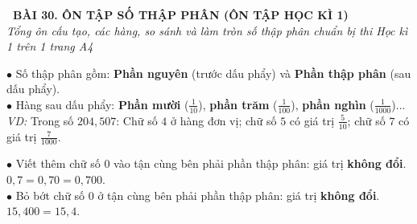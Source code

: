 \documentclass[14pt,a4paper,oneside]{extbook}
\begin{document}
\noindent
\begin{tcolorbox}[
  enhanced,
  colback=teal!8!white,
  colframe=teal!80!black,
  arc=3mm,
  boxrule=1.1pt,
  width=\linewidth,
  halign=center,
  top=2.2mm, bottom=2.2mm,
  left=3mm, right=3mm,
  drop fuzzy shadow
]
  {\large\bfseries\color{teal!95!black}\faBookmark\ BÀI 30. ÔN TẬP SỐ THẬP PHÂN (ÔN TẬP HỌC KÌ 1)}\\[2pt]
  {\scriptsize\color{black!75}\itshape Tổng ôn cấu tạo, các hàng, so sánh và làm tròn số thập phân chuẩn bị thi Học kì 1 trên 1 trang A4}
\end{tcolorbox}

\vspace{3.2mm}
\noindent
\begin{minipage}[t]{0.56\textwidth}
  \begin{tcolorbox}[
    enhanced,
    title={\footnotesize\bfseries\color{white}\faKey\ 1. Cấu tạo và giá trị chữ số},
    colback=blue!2!white,
    colframe=blue!75!black,
    arc=2.5mm, boxrule=0.8pt, top=1.8mm, bottom=1.8mm, left=2.2mm, right=2.2mm
  ]
    \footnotesize
    $\bullet$ Số thập phân gồm: \textbf{Phần nguyên} (trước dấu phẩy) và \textbf{Phần thập phân} (sau dấu phẩy).\\
    $\bullet$ Hàng sau dấu phẩy: \textbf{Phần mười} ($\frac{1}{10}$), \textbf{phần trăm} ($\frac{1}{100}$), \textbf{phần nghìn} ($\frac{1}{1000}$)...\\
    \textit{VD:} Trong số $204,507$: Chữ số $4$ ở hàng đơn vị; chữ số $5$ có giá trị $\frac{5}{10}$; chữ số $7$ có giá trị $\frac{7}{1000}$.
  \end{tcolorbox}
\end{minipage}%
\hfill
\begin{minipage}[t]{0.42\textwidth}
  \begin{tcolorbox}[
    enhanced,
    title={\footnotesize\bfseries\color{white}\faExchange\ 2. Số thập phân bằng nhau},
    colback=teal!2!white,
    colframe=teal!75!black,
    arc=2.5mm, boxrule=0.8pt, top=1.8mm, bottom=1.8mm, left=2mm, right=2mm
  ]
    \footnotesize
    $\bullet$ Viết thêm chữ số $0$ vào tận cùng bên phải phần thập phân: giá trị \textbf{không đổi}.\\
    $0,7 = 0,70 = 0,700$.\\
    $\bullet$ Bỏ bớt chữ số $0$ ở tận cùng bên phải phần thập phân: giá trị \textbf{không đổi}.\\
    $15,400 = 15,4$.
  \end{tcolorbox}
\end{minipage}
\end{document}
